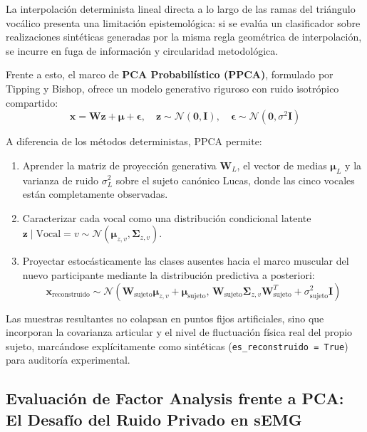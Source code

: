 \documentclass[11pt,a4paper,openany]{book}
\theoremstyle{definition}
\begin{document}
La interpolación determinista lineal directa a lo largo de las ramas del triángulo vocálico presenta una limitación epistemológica: si se evalúa un clasificador sobre realizaciones sintéticas generadas por la misma regla geométrica de interpolación, se incurre en fuga de información y circularidad metodológica.

Frente a esto, el marco de \textbf{PCA Probabilístico (PPCA)}, formulado por Tipping y Bishop, ofrece un modelo generativo riguroso con ruido isotrópico compartido:
\begin{equation}
\mathbf{x} = \mathbf{W} \mathbf{z} + \boldsymbol{\mu} + \boldsymbol{\epsilon}, \quad \mathbf{z} \sim \mathcal{N}(\mathbf{0}, \mathbf{I}), \quad \boldsymbol{\epsilon} \sim \mathcal{N}(\mathbf{0}, \sigma^2 \mathbf{I})
\end{equation}

A diferencia de los métodos deterministas, PPCA permite:
\begin{enumerate}
    \item Aprender la matriz de proyección generativa $\mathbf{W}_L$, el vector de medias $\boldsymbol{\mu}_L$ y la varianza de ruido $\sigma_L^2$ sobre el sujeto canónico Lucas, donde las cinco vocales están completamente observadas.
    \item Caracterizar cada vocal como una distribución condicional latente $\mathbf{z} \mid \text{Vocal} = v \sim \mathcal{N}(\boldsymbol{\mu}_{z, v}, \boldsymbol{\Sigma}_{z, v})$.
    \item Proyectar estocásticamente las clases ausentes hacia el marco muscular del nuevo participante mediante la distribución predictiva a posteriori:
    \begin{equation}
    \mathbf{x}_{\text{reconstruido}} \sim \mathcal{N}\left( \mathbf{W}_{\text{sujeto}} \boldsymbol{\mu}_{z, v} + \boldsymbol{\mu}_{\text{sujeto}},\, \mathbf{W}_{\text{sujeto}} \boldsymbol{\Sigma}_{z, v} \mathbf{W}_{\text{sujeto}}^T + \sigma_{\text{sujeto}}^2 \mathbf{I} \right)
    \end{equation}
\end{enumerate}

Las muestras resultantes no colapsan en puntos fijos artificiales, sino que incorporan la covarianza articular y el nivel de fluctuación física real del propio sujeto, marcándose explícitamente como sintéticas (\texttt{es\_reconstruido = True}) para auditoría experimental.

\subsection{Evaluación de Factor Analysis frente a PCA: El Desafío del Ruido Privado en sEMG}
\label{subsec:factor_analysis_vs_pca_ruido}
\end{document}
